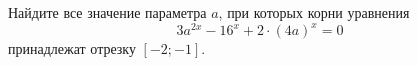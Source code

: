 \begin{ex}
	\begin{condition}
		Найдите все значение параметра \( a \), при которых корни уравнения
		\[ 3a^{2x}-16^x+2\cdot(4a)^x=0 \]
		принадлежат отрезку \( [-2;-1] \).
	\end{condition}
\end{ex}